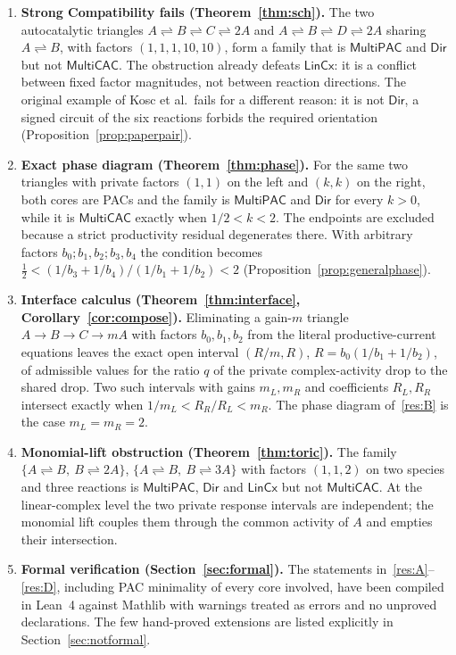 \documentclass[11pt,a4paper]{article}
\theoremstyle{plain}
\theoremstyle{definition}
\theoremstyle{remark}
\newcommand{\MPAC}{\mathsf{MultiPAC}}
\newcommand{\MCAC}{\mathsf{MultiCAC}}
\newcommand{\DIR}{\mathsf{Dir}}
\newcommand{\LIN}{\mathsf{LinCx}}
\newcommand{\rev}{\rightleftharpoons}
\begin{document}
\begin{enumerate}[label=(\Alph*)]
\item\label{res:A} \textbf{Strong Compatibility fails (Theorem~\ref{thm:sch}).} The two autocatalytic triangles $A\rev B\rev C\rev 2A$ and $A\rev B\rev D\rev 2A$ sharing $A\rev B$, with factors $(1,1,1,10,10)$, form a family that is $\MPAC$ and $\DIR$ but not $\MCAC$. The obstruction already defeats $\LIN$: it is a conflict between fixed factor magnitudes, not between reaction directions. The original example of Kosc et al.\ fails for a different reason: it is not $\DIR$, a signed circuit of the six reactions forbids the required orientation (Proposition~\ref{prop:paperpair}).
\item\label{res:B} \textbf{Exact phase diagram (Theorem~\ref{thm:phase}).} For the same two triangles with private factors $(1,1)$ on the left and $(k,k)$ on the right, both cores are PACs and the family is $\MPAC$ and $\DIR$ for every $k>0$, while it is $\MCAC$ exactly when $1/2<k<2$. The endpoints are excluded because a strict productivity residual degenerates there. With arbitrary factors $b_0;b_1,b_2;b_3,b_4$ the condition becomes $\tfrac12<(1/b_3+1/b_4)/(1/b_1+1/b_2)<2$ (Proposition~\ref{prop:generalphase}).
\item\label{res:C} \textbf{Interface calculus (Theorem~\ref{thm:interface}, Corollary~\ref{cor:compose}).} Eliminating a gain-$m$ triangle $A\to B\to C\to mA$ with factors $b_0,b_1,b_2$ from the literal productive-current equations leaves the exact open interval $(R/m,R)$, $R=b_0(1/b_1+1/b_2)$, of admissible values for the ratio $q$ of the private complex-activity drop to the shared drop. Two such intervals with gains $m_L,m_R$ and coefficients $R_L,R_R$ intersect exactly when $1/m_L<R_R/R_L<m_R$. The phase diagram of~\ref{res:B} is the case $m_L=m_R=2$.
\item\label{res:D} \textbf{Monomial-lift obstruction (Theorem~\ref{thm:toric}).} The family $\{A\rev B,\ B\rev 2A\}$, $\{A\rev B,\ B\rev 3A\}$ with factors $(1,1,2)$ on two species and three reactions is $\MPAC$, $\DIR$ and $\LIN$ but not $\MCAC$. At the linear-complex level the two private response intervals are independent; the monomial lift couples them through the common activity of $A$ and empties their intersection.
\item\label{res:E} \textbf{Formal verification (Section~\ref{sec:formal}).} The statements in~\ref{res:A}--\ref{res:D}, including PAC minimality of every core involved, have been compiled in Lean~4 \citep{demoura2021} against Mathlib \citep{mathlib2020} with warnings treated as errors and no unproved declarations. The few hand-proved extensions are listed explicitly in Section~\ref{sec:notformal}.
\end{enumerate}
\end{document}
